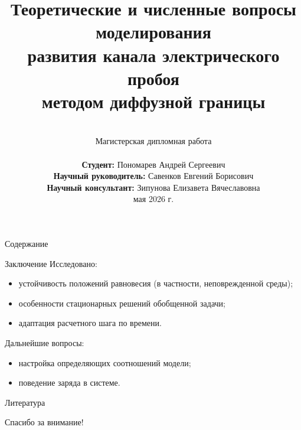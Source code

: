 \documentclass[aspectratio=169]{beamer}
\title[Электрический пробой]{Теоретические и численные вопросы моделирования \\ развития канала электрического пробоя \\ методом диффузной границы}
\author[Пономарев А. С.]{
	\hfill \\[-6mm]
	Магистерская дипломная работа \\[3mm]
	\raggedright
	\hspace*{7.5cm}
	\textbf{Студент:} \linebreak
	\hspace*{7.5cm}
	Пономарев Андрей Сергеевич \\[2mm]
	\hspace*{7.5cm}
	\textbf{Научный руководитель:} \linebreak
	\hspace*{7.5cm}
	Савенков Евгений Борисович \\[2mm]
	\hspace*{7.5cm}
	\textbf{Научный консультант:} \linebreak
	\hspace*{7.5cm}
	Зипунова Елизавета Вячеславовна \\[4mm]
	\centering
	28 мая 2026 г.
}
\institute[ИПМ, МФТИ]{}
\date[Предзащита]{}
\newcommand{\parind}{\hspace{7.5mm}}
\newcommand{\nologo}{\setbeamertemplate{logo}{}}
\begin{document}

\begin{frame}
\titlepage
\end{frame}

\begin{frame}{Содержание}
\Large
\tableofcontents
\end{frame}











\begin{frame}{Заключение}
\large
\parind Исследовано:
\begin{itemize}
	\item устойчивость положений равновесия (в частности, неповрежденной среды);
	\item особенности стационарных решений обобщенной задачи;
	\item адаптация расчетного шага по времени.
\end{itemize}
\vspace{4mm}
\parind Дальнейшие вопросы:
\begin{itemize}
	\item настройка определяющих соотношений модели;
	\item поведение заряда в системе.
\end{itemize}
\end{frame}

{
\nologo
\begin{frame}{Литература}
\vspace{-2mm}
\printbibliography
\end{frame}
}

\begin{frame}{}
\begin{center}
	\Large
	Спасибо за внимание!
\end{center}
\end{frame}
\end{document}
